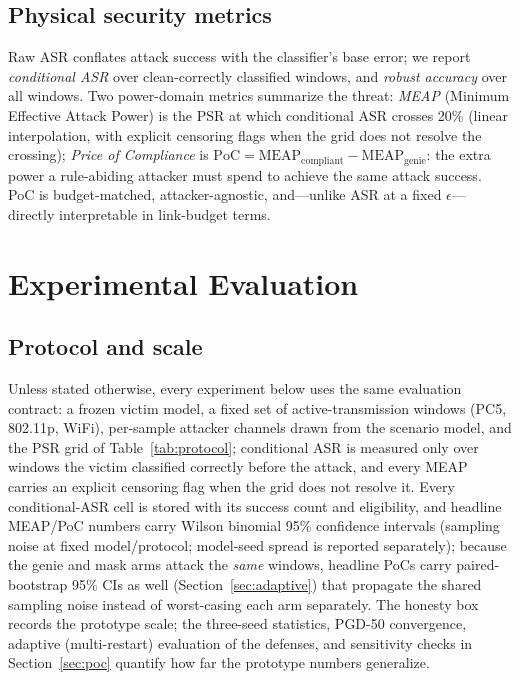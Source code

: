 \documentclass[review]{elsarticle}
\begin{document}
\subsection{Physical security metrics}
\label{sec:metrics}

Raw ASR conflates attack success with the classifier's base error; we
report \emph{conditional ASR} over clean-correctly classified windows, and
\emph{robust accuracy} over all windows. Two power-domain metrics summarize
the threat: \emph{MEAP} (Minimum Effective Attack Power) is the PSR at which
conditional ASR crosses 20\% (linear interpolation, with explicit censoring
flags when the grid does not resolve the crossing); \emph{Price of
Compliance} is $\mathrm{PoC} = \mathrm{MEAP}_{\mathrm{compliant}} -
\mathrm{MEAP}_{\mathrm{genie}}$: the extra power a rule-abiding attacker must
spend to achieve the same attack success. PoC is
budget-matched, attacker-agnostic, and---unlike ASR at a fixed
$\epsilon$---directly interpretable in link-budget terms.

\section{Experimental Evaluation}
\label{sec:experiments}

\subsection{Protocol and scale}
\label{sec:protocol}

Unless stated otherwise, every experiment below uses the same evaluation
contract: a frozen victim model, a fixed set of active-transmission windows
(PC5, 802.11p, WiFi), per-sample attacker channels drawn from the scenario
model, and the PSR grid of Table~\ref{tab:protocol}; conditional ASR is
measured only over windows the victim classified correctly before the
attack, and every MEAP carries an explicit censoring flag when the grid
does not resolve it. Every conditional-ASR cell is stored with its
success count and eligibility, and headline MEAP/PoC numbers carry
Wilson binomial 95\% confidence intervals (sampling noise at fixed
model/protocol; model-seed spread is reported separately); because the
genie and mask arms attack the \emph{same} windows, headline PoCs
carry paired-bootstrap 95\% CIs as well
(Section~\ref{sec:adaptive}) that propagate the shared sampling noise
instead of worst-casing each arm separately. The honesty box records the prototype scale; the
three-seed statistics, PGD-50 convergence, adaptive (multi-restart)
evaluation of the defenses, and sensitivity checks in
Section~\ref{sec:poc} quantify how far the prototype numbers generalize.
\end{document}
